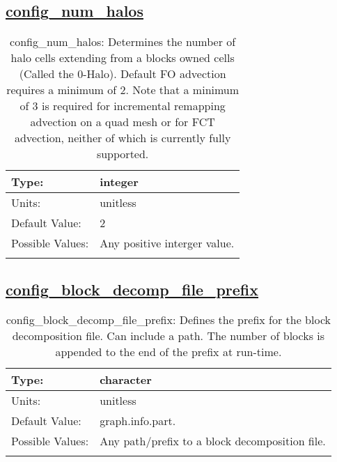 \subsection[config\_num\_halos]{\hyperref[sec:nm_tab_decomposition]{config\_num\_halos}}
\label{subsec:nm_sec_config_num_halos}
\begin{center}
\begin{longtable}{| p{2.0in} || p{4.0in} |}
    \hline
    Type: & integer \\
    \hline
    Units: & \si{unitless} \\
    \hline
    Default Value: & 2 \\
    \hline
    Possible Values: & Any positive interger value. \\
    \hline
    \caption{config\_num\_halos: Determines the number of halo cells extending from a blocks owned cells (Called the 0-Halo). Default FO advection requires a minimum of 2.  Note that a minimum of 3 is required for incremental remapping advection on a quad mesh or for FCT advection, neither of which is currently fully supported.}
\end{longtable}
\end{center}
\subsection[config\_block\_decomp\_file\_prefix]{\hyperref[sec:nm_tab_decomposition]{config\_block\_decomp\_file\_prefix}}
\label{subsec:nm_sec_config_block_decomp_file_prefix}
\begin{center}
\begin{longtable}{| p{2.0in} || p{4.0in} |}
    \hline
    Type: & character \\
    \hline
    Units: & \si{unitless} \\
    \hline
    Default Value: & graph.info.part. \\
    \hline
    Possible Values: & Any path/prefix to a block decomposition file. \\
    \hline
    \caption{config\_block\_decomp\_file\_prefix: Defines the prefix for the block decomposition file. Can include a path. The number of blocks is appended to the end of the prefix at run-time.}
\end{longtable}
\end{center}

